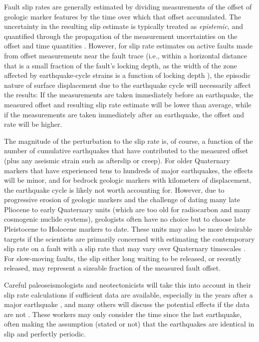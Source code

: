 \documentclass[se, manuscript]{copernicus}
\begin{document}
Fault slip rates are generally estimated by dividing measurements of the
offset of geologic marker features by the time over which that offset
accumulated. The uncertainty in the resulting slip estimate is typically
treated as \emph{epistemic}, and quantified through the propagation of
the measurement uncertainties on the offset and time quantities
\citep[e.g.,][]{bird_uncertainties_2007,zechar_incorporating_2009}.
However, for slip rate estimates on active faults made from offset
measurements near the fault trace (i.e., within a horizontal distance
that is a small fraction of the fault's locking depth, as the width of the zone 
affected by earthquake-cycle strains is a function of locking depth 
\citep[e.g.,][]{savage_geodetic_1973, hetland_interseismic_2006}), the episodic
nature of surface displacement due to the earthquake cycle will
necessarily affect the results: If the measurements are taken
immediately before an earthquake, the measured offset and resulting slip
rate estimate will be lower than average, while if the measurements are
taken immediately after an earthquake, the offset and rate will be
higher.

The magnitude of the perturbation to the slip rate is, of course, a
function of the number of cumulative earthquakes that have contributed
to the measured offset (plus any aseismic strain such as afterslip or creep).
For older Quaternary markers that have experienced tens to hundreds of major
earthquakes, the effects will be minor, and for bedrock geologic markers with
kilometers of displacement, the earthquake cycle is likely not worth accounting
for. However, due to progressive erosion of geologic markers and the challenge
of dating many late Pliocene to early Quaternary units (which are too old for
radiocarbon and many cosmogenic nuclide systems), geologists often have no
choice but to choose late Pleistocene to Holocene markers to date. These
units may also be more desirable targets if the scientists are primarily
concerned with estimating the contemporary slip rate on a fault with a slip
rate that may vary over Quaternary timescales
\citep[e.g.,][]{rittase_temporal_2014,zinke_highly_2018}. For slow-moving 
faults, the slip either long waiting to be released, or recently released, may 
represent a sizeable fraction of the measured fault offset.

Careful paleoseismologists and neotectonicists will take this into
account in their slip rate calculations if sufficient data are
available, especially in the years after a major earthquake
\citep[e.g.,][]{rizza_earthquake_2015}, and many others will discuss the
potential effects if the data are not \citep[e.g.,][]{lifton_latest_2015}.
These workers may only consider the time since the last earthquake,
often making the assumption (stated or not) that the earthquakes are
identical in slip and perfectly periodic.
\end{document}
